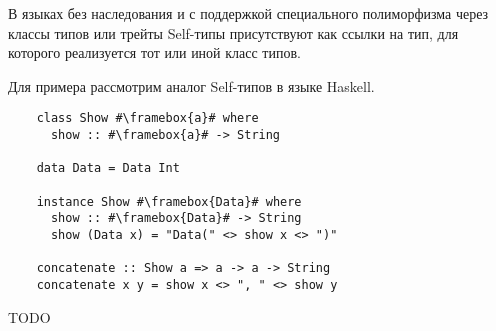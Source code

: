 В языках без наследования и с поддержкой специального полиморфизма через классы типов или трейты Self-типы присутствуют как ссылки на тип, для которого реализуется тот или иной класс типов.

Для примера рассмотрим аналог Self-типов в языке Haskell.


\begin{verbatim}
    class Show #\framebox{a}# where
      show :: #\framebox{a}# -> String

    data Data = Data Int

    instance Show #\framebox{Data}# where
      show :: #\framebox{Data}# -> String
      show (Data x) = "Data(" <> show x <> ")"

    concatenate :: Show a => a -> a -> String
    concatenate x y = show x <> ", " <> show y
\end{verbatim}

TODO %
